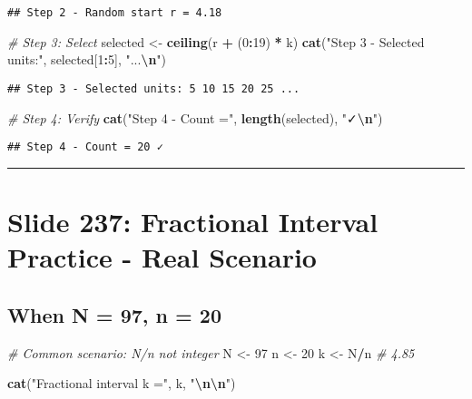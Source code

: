 \documentclass[
]{article}
\newenvironment{Shaded}{\begin{snugshade}}{\end{snugshade}}
\newcommand{\CommentTok}[1]{\textcolor[rgb]{0.56,0.35,0.01}{\textit{#1}}}
\newcommand{\DecValTok}[1]{\textcolor[rgb]{0.00,0.00,0.81}{#1}}
\newcommand{\FunctionTok}[1]{\textcolor[rgb]{0.13,0.29,0.53}{\textbf{#1}}}
\newcommand{\NormalTok}[1]{#1}
\newcommand{\OtherTok}[1]{\textcolor[rgb]{0.56,0.35,0.01}{#1}}
\newcommand{\SpecialCharTok}[1]{\textcolor[rgb]{0.81,0.36,0.00}{\textbf{#1}}}
\newcommand{\StringTok}[1]{\textcolor[rgb]{0.31,0.60,0.02}{#1}}
\begin{document}
\begin{verbatim}
## Step 2 - Random start r = 4.18
\end{verbatim}

\begin{Shaded}
\begin{Highlighting}[]
\CommentTok{\# Step 3: Select}
\NormalTok{selected }\OtherTok{\textless{}{-}} \FunctionTok{ceiling}\NormalTok{(r }\SpecialCharTok{+}\NormalTok{ (}\DecValTok{0}\SpecialCharTok{:}\DecValTok{19}\NormalTok{) }\SpecialCharTok{*}\NormalTok{ k)}
\FunctionTok{cat}\NormalTok{(}\StringTok{"Step 3 {-} Selected units:"}\NormalTok{, selected[}\DecValTok{1}\SpecialCharTok{:}\DecValTok{5}\NormalTok{], }\StringTok{"...}\SpecialCharTok{\textbackslash{}n}\StringTok{"}\NormalTok{)}
\end{Highlighting}
\end{Shaded}

\begin{verbatim}
## Step 3 - Selected units: 5 10 15 20 25 ...
\end{verbatim}

\begin{Shaded}
\begin{Highlighting}[]
\CommentTok{\# Step 4: Verify}
\FunctionTok{cat}\NormalTok{(}\StringTok{"Step 4 {-} Count ="}\NormalTok{, }\FunctionTok{length}\NormalTok{(selected), }\StringTok{"✓}\SpecialCharTok{\textbackslash{}n}\StringTok{"}\NormalTok{)}
\end{Highlighting}
\end{Shaded}

\begin{verbatim}
## Step 4 - Count = 20 ✓
\end{verbatim}

\begin{center}\rule{0.5\linewidth}{0.5pt}\end{center}

\section{Slide 237: Fractional Interval Practice - Real
Scenario}\label{slide-237-fractional-interval-practice---real-scenario}

\subsection{When N = 97, n = 20}\label{when-n-97-n-20}

\begin{Shaded}
\begin{Highlighting}[]
\CommentTok{\# Common scenario: N/n not integer}
\NormalTok{N }\OtherTok{\textless{}{-}} \DecValTok{97}
\NormalTok{n }\OtherTok{\textless{}{-}} \DecValTok{20}
\NormalTok{k }\OtherTok{\textless{}{-}}\NormalTok{ N}\SpecialCharTok{/}\NormalTok{n  }\CommentTok{\# 4.85}

\FunctionTok{cat}\NormalTok{(}\StringTok{"Fractional interval k ="}\NormalTok{, k, }\StringTok{"}\SpecialCharTok{\textbackslash{}n\textbackslash{}n}\StringTok{"}\NormalTok{)}
\end{Highlighting}
\end{Shaded}
\end{document}
